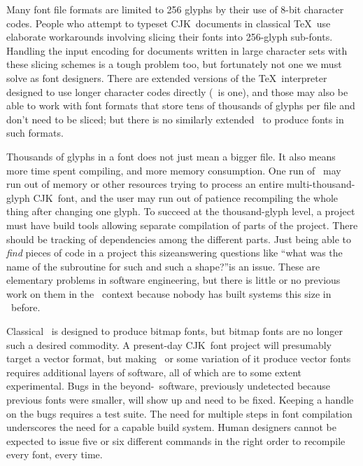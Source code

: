 \documentclass{ltugboat}
\def\CJK{CJK}
\begin{document}
Many font file formats are limited to 256 glyphs by their use of 8-bit
character codes.  People who attempt to typeset \CJK\ documents in classical
\TeX\ use elaborate workarounds involving slicing their
\linebreak%
 fonts into 256-glyph
sub-fonts.  Handling the input encoding for documents written in large
character sets with these slicing schemes is a tough problem too, but
fortunately not one we must solve as font designers.  There are extended
versions of the \TeX\ interpreter designed to use longer character codes
directly (\XeTeX\ is one), and those may also be able to work with font
formats that store tens of thousands of glyphs per file and don't need to be
sliced; but there is no similarly extended \MF\ to produce fonts in such
formats.

Thousands of glyphs in a font does not just mean a bigger file.  It also
means more time spent compiling, and more memory consumption.  One run of
\MF\ may run out of memory or other resources trying to process an entire
multi-thousand-glyph \CJK\ font, and the user may run out of patience
recompiling the whole thing after changing one glyph.  To succeed at the
thousand-glyph level, a project must have build tools allowing separate
compilation of parts of the project.  There should be tracking of
dependencies among the different parts.  Just being able to \emph{find}
pieces of code in a project this size\Dash answering questions like ``what
was the name of the subroutine for such and such a shape?''\Dash is an
issue.  These are elementary problems in software engineering, but there is
little or no previous work on them in the \MF\ context because nobody has
built systems this size in \MF\ before.

Classical \MF\ is designed to produce
\linebreak%
bitmap fonts, but bitmap fonts are no
longer such a desired commodity.  A present-day \CJK\ font project will
presumably target a vector format, but making \MF\ or some variation of it
produce vector fonts requires additional layers of software, all of which
are to some extent experimental.  Bugs in the beyond-\MF\ software,
previously undetected because previous fonts were smaller, will show up and
need to be fixed.  Keeping a handle on the bugs requires a test suite.  The
need for multiple steps in font compilation underscores the need for a
capable build system.  Human designers cannot be expected to issue five or
six different commands in the right order to recompile every font, every time.
\end{document}
